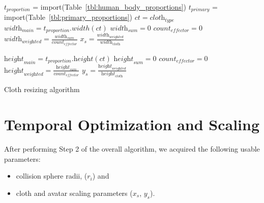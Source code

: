 \begin{algorithm}[ht]
\DontPrintSemicolon %

$t_\textit{proportion}$ = {\textrm import}({\textrm Table~\ref{tbl:human_body_proportions}}) \;
$t_\textit{primary}$ = {\textrm import}({\textrm Table~\ref{tbl:primary_proportions}}) \;
$ct=\textit{cloth}_\textit{type}$\;
$\textit{width}_\textit{main}=t_\textit{proportion}.width(ct)$\;
$\textit{width}_\textit{sum}=0$\;
$\textit{count}_\textit{effector}=0$\;
$\textit{width}_\textit{weighted}=\frac{\textit{width}_\textit{sum}}{\textit{count}_{\textit{effector}}}$\;
$x_s=\frac{\textit{width}_\textit{weighted}}{\textit{width}_\textit{cloth}}$\;

$\textit{height}_\textit{main}=t_\textit{proportion}.\textit{height}(ct)$\;
$\textit{height}_\textit{sum}=0$\;
$\textit{count}_\textit{effector}=0$\;
$\textit{height}_\textit{weighted}=\frac{\textit{height}_\textit{sum}}{\textit{count}_{\textit{effector}}}$\;
$y_s=\frac{\textit{height}_\textit{weighted}}{\textit{height}_\textit{cloth}}$\;
\caption{Cloth resizing algorithm}
\label{algo:cloth_resize}
\end{algorithm}

\section{Temporal Optimization and Scaling}
After performing Step 2 of the overall algorithm, we acquired the following usable parameters:

\begin{itemize}
\item collision sphere radii, ($r_i$) and
\item cloth and avatar scaling parameters ($x_s$, $y_s$).
\end{itemize}

